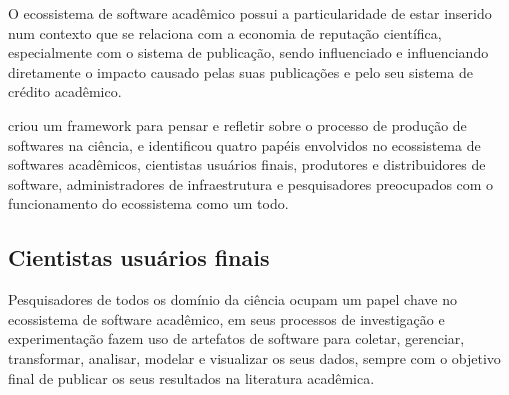
O ecossistema de software acadêmico possui a particularidade de estar inserido
num contexto que se relaciona com a economia de reputação científica,
especialmente com o sistema de publicação, sendo influenciado e influenciando
diretamente o impacto causado pelas suas publicações e pelo seu sistema de crédito
acadêmico.


 criou um framework para pensar e refletir
sobre o processo de produção de softwares na ciência, e identificou quatro
papéis envolvidos no ecossistema de softwares acadêmicos, cientistas usuários
finais, produtores e distribuidores de software, administradores de
infraestrutura e pesquisadores preocupados com o funcionamento do ecossistema
como um todo.

%

\subsection{Cientistas usuários finais}

Pesquisadores de todos os domínio da ciência ocupam um papel chave no
ecossistema de software acadêmico, em seus processos de investigação e
experimentação fazem uso de artefatos de software para coletar, gerenciar,
transformar, analisar, modelar e visualizar os seus dados, sempre com o
objetivo final de publicar os seus resultados na literatura acadêmica.

